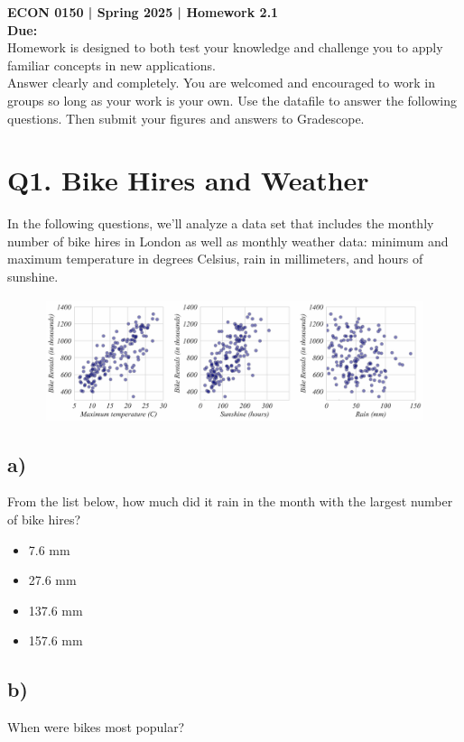 \documentclass[12pt]{article}
\begin{document}
\vspace*{-1cm}
\noindent \textbf{ECON 0150 | Spring 2025 | Homework 2.1} \\
\textbf{Due: } \\

\noindent Homework is designed to both test your knowledge and challenge you to apply familiar concepts in new applications. \\
Answer clearly and completely. You are welcomed and encouraged to work in groups so long as your work is your own. Use the datafile to answer the following questions. Then submit your figures and answers to Gradescope.

\section*{Q1. Bike Hires and Weather}

\noindent In the following questions, we'll analyze a data set that includes the monthly number of bike hires in London as well as monthly weather data: minimum and maximum temperature in degrees Celsius, rain in millimeters, and hours of sunshine.

\begin{figure}[h]
    \centering
    \includegraphics[width=1\linewidth]{Figures/HW4_image.png}
\end{figure}

\subsection*{a)} From the list below, how much did it rain in the month with the largest number of bike hires?

\begin{itemize}[leftmargin=1.5cm]
    \item 7.6 mm
    \item 27.6 mm
    \item 137.6 mm
    \item 157.6 mm
\end{itemize}

\subsection*{b)} When were bikes most popular?
\end{document}
